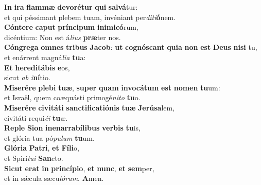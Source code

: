 \evenverse \textbf{In} \textbf{i}\textbf{ra} \textbf{flam}\textbf{mæ} \textbf{de}\textbf{vo}\textbf{ré}\textbf{tur} \textbf{qui} \textbf{sal}\textbf{vá}tur:~\*\\
\evenverse et qui péssimant plebem tuam, invéniant per\textit{di}\textit{ti}\textbf{ó}nem.\\
\oddverse \textbf{Cón}\textbf{te}\textbf{re} \textbf{ca}\textbf{put} \textbf{prín}\textbf{ci}\textbf{pum} \textbf{i}\textbf{ni}\textbf{mi}\textbf{có}rum,~\*\\
\oddverse dicéntium: Non est á\textit{li}\textit{us} \textbf{præ}ter nos.\\
\evenverse \textbf{Cón}\textbf{gre}\textbf{ga} \textbf{om}\textbf{nes} \textbf{tri}\textbf{bus} \textbf{Ja}\textbf{cob}: \textbf{ut} \textbf{co}\textbf{gnó}\textbf{scant} \textbf{qui}\textbf{a} \textbf{non} \textbf{est} \textbf{De}\textbf{us} \textbf{ni}\textbf{si} tu,~\*\\
\evenverse et enárrent magná\textit{li}\textit{a} \textbf{tu}a:\\
\oddverse \textbf{Et} \textbf{he}\textbf{re}\textbf{di}\textbf{tá}\textbf{bis} \textbf{e}os,~\*\\
\oddverse sicut \textit{ab} \textit{i}\textbf{ní}tio.\\
\evenverse \textbf{Mi}\textbf{se}\textbf{ré}\textbf{re} \textbf{ple}\textbf{bi} \textbf{tu}\textbf{æ}, \textbf{su}\textbf{per} \textbf{quam} \textbf{in}\textbf{vo}\textbf{cá}\textbf{tum} \textbf{est} \textbf{no}\textbf{men} \textbf{tu}um:~\*\\
\evenverse et Israël, quem coæquásti primogé\textit{ni}\textit{to} \textbf{tu}o.\\
\oddverse \textbf{Mi}\textbf{se}\textbf{ré}\textbf{re} \textbf{ci}\textbf{vi}\textbf{tá}\textbf{ti} \textbf{san}\textbf{cti}\textbf{fi}\textbf{ca}\textbf{ti}\textbf{ó}\textbf{nis} \textbf{tu}\textbf{æ} \textbf{Je}\textbf{rú}\textbf{sa}lem,~\*\\
\oddverse civitáti requi\textit{é}\textit{i} \textbf{tu}æ.\\
\evenverse \textbf{Re}\textbf{ple} \textbf{Si}\textbf{on} \textbf{i}\textbf{ne}\textbf{nar}\textbf{ra}\textbf{bí}\textbf{li}\textbf{bus} \textbf{ver}\textbf{bis} \textbf{tu}is,~\*\\
\evenverse et glória tua pó\textit{pu}\textit{lum} \textbf{tu}um.\\
\oddverse \textbf{Gló}\textbf{ri}\textbf{a} \textbf{Pa}\textbf{tri}, \textbf{et} \textbf{Fí}\textbf{li}o,~\*\\
\oddverse et Spirí\textit{tu}\textit{i} \textbf{San}cto.\\
\evenverse \textbf{Si}\textbf{cut} \textbf{e}\textbf{rat} \textbf{in} \textbf{prin}\textbf{cí}\textbf{pi}\textbf{o}, \textbf{et} \textbf{nunc}, \textbf{et} \textbf{sem}per,~\*\\
\evenverse et in sǽcula sæcu\textit{ló}\textit{rum}. \textbf{A}men.\\
